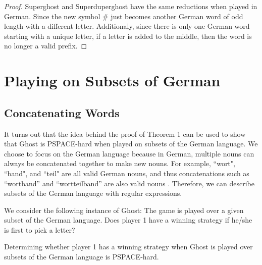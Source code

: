 \documentclass[runningheads,a4paper]{llncs}
\begin{document}
\begin{proof}
Superghost and Superduperghost have the same reductions when played in German. Since the new symbol \# just becomes another German word of odd length with a different letter. Additionaly, since there is only one German word starting with a unique letter, if a letter is added to the middle, then the word is no longer a valid prefix. 
\end{proof}

\section{Playing on Subsets of German}

\subsection{Concatenating Words}



It turns out that the idea behind the proof of Theorem 1 can be used to show that Ghost is PSPACE-hard when played on subsets of the German language. We choose to focus on the German language because in German, multiple nouns can always be concatenated together to make new nouns. For example, ``wort", ``band", and ``teil" are all valid German nouns, and thus concatenations such as “wortband” and “wortteilband” are also valid nouns \cite{german}. Therefore, we can describe subsets of the German language with regular expressions.

We consider the following instance of Ghost: The game is played over a given subset of the German language. Does player 1 have a winning strategy if he/she is first to pick a letter?

\begin{theorem}Determining whether player 1 has a winning strategy when Ghost is played over subsets of the German language is PSPACE-hard.
\end{theorem}
\end{document}

